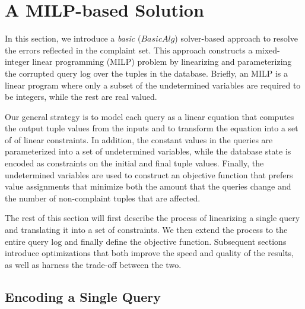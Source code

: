 
\section{A MILP-based Solution}
\label{sec:sol}

In this section, we introduce a \emph{basic} ($BasicAlg$) solver-based approach to 
resolve the errors reflected in the complaint set.
This approach constructs a mixed-integer linear 
programming (MILP) problem by linearizing and parameterizing the 
corrupted query log over the tuples in the database. 
Briefly, an MILP is a linear program where only a subset of the undetermined variables
are required to be integers, while the rest are real valued.

Our general strategy is to model each query as a linear equation 
that computes the output tuple values from the inputs and to transform the
equation into a set of of linear constraints.   
In addition, the constant values in the queries are parameterized
into a set of undetermined variables, while the database state is encoded 
as constraints on the initial and final tuple values.
Finally, the undetermined variables are used to construct an objective function
that prefers value assignments that minimize both the amount that the queries change and
the number of non-complaint tuples that are affected. 

The rest of this section will first describe the process of linearizing a single query
and translating it into a set of constraints.  We then extend the process to the entire
query log and finally define the objective function.
Subsequent sections introduce optimizations that both
improve the speed and quality of the results, as well as harness the trade-off between the two. 








\subsection{Encoding a Single Query}%
\label{sec:linearize}

